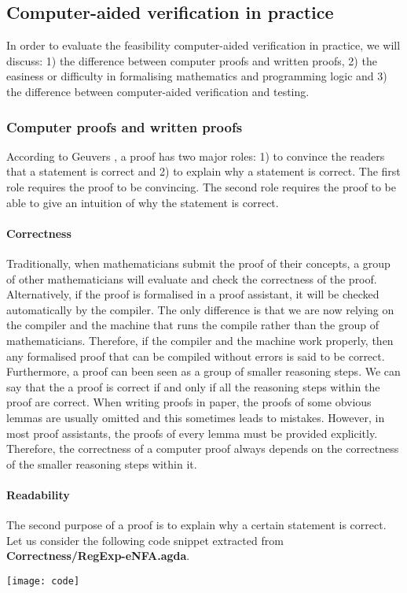 \subsection{Computer-aided verification in practice}
\par In order to evaluate the feasibility computer-aided verification in
practice, we will discuss: 1) the difference between computer proofs and written proofs, 2) the easiness or
difficulty in formalising mathematics and programming logic and 3) the
difference between computer-aided verification and testing. 


\subsubsection{Computer proofs and written proofs}
\par According to Geuvers \cite{geuvers2009}, a proof has two major roles: 1)
to convince the readers that a statement is correct and 2) to explain
why a statement is correct. The first role requires the proof to be
convincing. The second role requires the proof to be able to give an
intuition of why the statement is correct. 

\paragraph{Correctness} Traditionally, when mathematicians submit
the proof of their concepts, a group of other mathematicians will
evaluate and check the correctness of the proof. Alternatively, if the
proof is formalised in a proof assistant, it will be checked 
automatically by the compiler. The only difference is that we are now
relying on the compiler and the machine that runs the compile rather
than the group of mathematicians. Therefore, if the compiler and the
machine work properly, then any formalised proof that
can be compiled without errors is said to be correct. Furthermore, a
proof can been seen as a group of smaller reasoning steps. We can say that the a proof is correct if and only if all the
reasoning steps within the proof are correct. When writing proofs in paper, the proofs of
some obvious lemmas are usually omitted and this sometimes leads to mistakes. However, in
most proof assistants, the proofs of every lemma must be provided explicitly. Therefore, the correctness of
a computer proof always depends on the correctness of the smaller reasoning steps within it. 

\paragraph{Readability} The second purpose of a proof is to explain why
a certain statement is correct. Let us consider the following code
snippet extracted from \textbf{Correctness/RegExp-eNFA.agda}. 
\begin{center} \texttt{[image: code]} \end{center}

